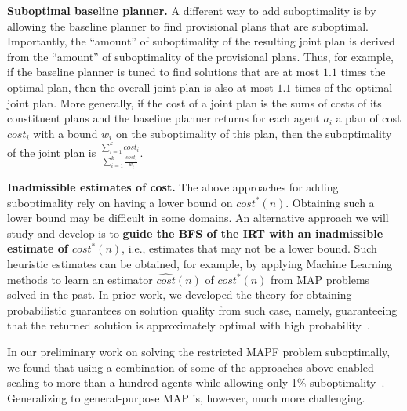 \documentclass[11pt]{article}
\begin{document}


{\bf Suboptimal baseline planner.} 
A different way to add suboptimality is by allowing the baseline planner to find provisional plans that are suboptimal. Importantly, the ``amount'' of suboptimality of the resulting joint plan is derived from the ``amount'' of suboptimality of the provisional plans. Thus, for example, if the baseline planner is tuned to find solutions that are at most $1.1$ times the optimal plan, then the overall joint plan is also at most $1.1$ times of the optimal joint plan. More generally, if the cost of a joint plan is the sums of costs of its constituent plans and the baseline planner returns for each agent $a_i$ a plan of cost $cost_i$ with a bound $w_i$ on the suboptimality of this plan, then the suboptimality of the joint plan is $\frac{\sum_{i=1}^k cost_i}{\sum_{i=1}^k \frac{cost_i}{w_i}}$.  

{\bf Inadmissible estimates of cost.}
The above approaches for adding suboptimality rely on having a lower bound on $cost^*(n)$. Obtaining such a lower bound may be difficult in some domains. An alternative approach we will study and develop is to {\bf guide the BFS of the IRT with an inadmissible estimate of $cost^*(n)$}, i.e., estimates that may not be a lower bound. Such heuristic estimates can be obtained, for example, by applying Machine Learning methods to learn an estimator $\widehat{cost}(n)$ of $cost^*(n)$ from MAP problems solved in the past. 
In prior work, we developed the theory for obtaining probabilistic guarantees on solution quality from such case, namely, guaranteeing that the returned solution is approximately optimal with high probability~\cite{stern2011probably,stern2012search}. 


In our preliminary work on solving the restricted MAPF problem suboptimally, we found that using a combination of some of the approaches above enabled scaling to more than a hundred agents while allowing only 1\% suboptimality~\cite{barer2014suboptimal-socs}. Generalizing to general-purpose MAP is, however, much more challenging. 
\end{document}
